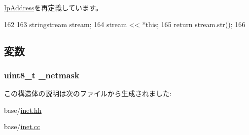 \hyperlink{structNet_1_1IpAddress_a14a0e4fdb44bd7be64a3c6e5d94f8f0e}{IpAddress}を再定義しています。


\begin{DoxyCode}
162 {
163     stringstream stream;
164     stream << *this;
165     return stream.str();
166 }
\end{DoxyCode}


\subsection{変数}
\hypertarget{structNet_1_1IpNetmask_ae0f53299fbdcc8b2714448516f52b618}{
\subsubsection[{\_\-netmask}]{\setlength{\rightskip}{0pt plus 5cm}uint8\_\-t {\bf \_\-netmask}}}
\label{structNet_1_1IpNetmask_ae0f53299fbdcc8b2714448516f52b618}


この構造体の説明は次のファイルから生成されました:\begin{DoxyCompactItemize}
\item 
base/\hyperlink{inet_8hh}{inet.hh}\item 
base/\hyperlink{inet_8cc}{inet.cc}\end{DoxyCompactItemize}
